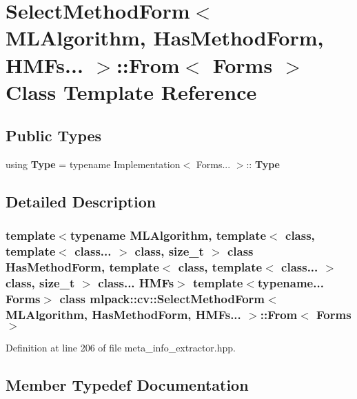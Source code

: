 \section{Select\+Method\+Form$<$ M\+L\+Algorithm, Has\+Method\+Form, H\+M\+Fs... $>$\+:\+:From$<$ Forms $>$ Class Template Reference}
\label{classmlpack_1_1cv_1_1SelectMethodForm_3_01MLAlgorithm_00_01HasMethodForm_00_01HMFs_8_8_8_01_4_1_1From}
\subsection*{Public Types}
\begin{DoxyCompactItemize}
\item 
using \textbf{ Type} = typename Implementation$<$ Forms... $>$\+::\textbf{ Type}
\end{DoxyCompactItemize}


\subsection{Detailed Description}
\subsubsection*{template$<$typename M\+L\+Algorithm, template$<$ class, template$<$ class... $>$ class, size\+\_\+t $>$ class Has\+Method\+Form, template$<$ class, template$<$ class... $>$ class, size\+\_\+t $>$ class... H\+M\+Fs$>$\newline
template$<$typename... Forms$>$\newline
class mlpack\+::cv\+::\+Select\+Method\+Form$<$ M\+L\+Algorithm, Has\+Method\+Form, H\+M\+Fs... $>$\+::\+From$<$ Forms $>$}



Definition at line 206 of file meta\+\_\+info\+\_\+extractor.\+hpp.



\subsection{Member Typedef Documentation}
\mbox{\label{classmlpack_1_1cv_1_1SelectMethodForm_3_01MLAlgorithm_00_01HasMethodForm_00_01HMFs_8_8_8_01_4_1_1From_a1df7dc60b062d0a6ede4b3606b04bd04}} 
